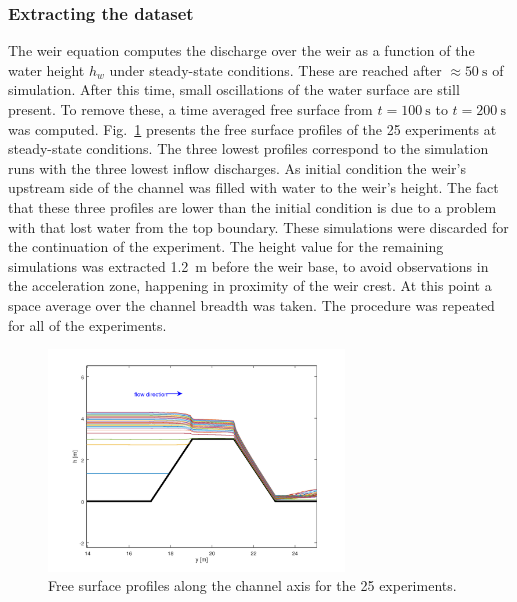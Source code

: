 \subsubsection{Extracting the dataset}
The weir equation computes the discharge over the weir as a function of the water height $h_w$ under steady-state conditions.
These are reached after $\approx \SI{50}{\s}$ of simulation.
After this time, small oscillations of the water surface are still present.
To remove these, a time averaged free surface from $t = \SI{100}{\s}$ to $t = \SI{200}{\s}$ was computed.
Fig.~\ref{fig:free_surfaces} presents the free surface profiles of the \num{25} experiments at steady-state conditions.
The three lowest profiles correspond to the simulation runs with the three lowest inflow discharges. 
As initial condition the weir's upstream side of the channel was filled with water to the weir's height.
The fact that these three profiles are lower than the initial condition is due to a problem with  that lost water from the top boundary.
These simulations were discarded for the continuation of the experiment.
The height value for the remaining simulations was extracted \SI{1.2}{\m} before the weir base, to avoid observations in the acceleration zone, happening in proximity of the weir crest.
At this point a space average over the channel breadth was taken.
The procedure was repeated for all of the experiments.

\begin{figure}[h]
  \centering
  \includegraphics[width=0.7\textwidth]{Figures/free_surfaces.png}
  \caption{Free surface profiles along the channel axis for the \num{25} experiments.}
  \label{fig:free_surfaces}
\end{figure}


